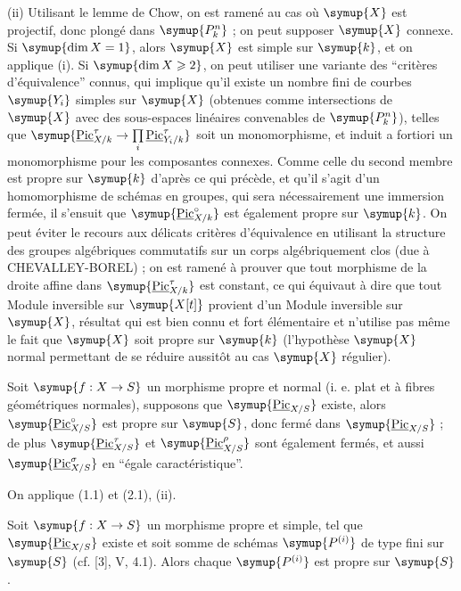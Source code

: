 (ii) Utilisant le lemme de Chow, on est ramené au cas où $\symup{X}$ est projectif,
donc plongé dans $\symup{P_k^n}$ ; on peut supposer $\symup{X}$ connexe. Si
$\symup{\dim X=1}$, alors $\symup{X}$ est simple sur $\symup{k}$, et on applique (i). Si $\symup{\dim X\geqslant2}$,
on peut utiliser une variante des ``critères d'équivalence'' connus, qui
implique qu'il existe un nombre fini de courbes $\symup{Y_i}$ simples sur $\symup{X}$ (obtenues
comme intersections de $\symup{X}$ avec des sous-espaces linéaires convenables de
$\symup{P_k^n}$), telles que $\symup{\underline{\operatorname{Pic}}_{X/k}^\tau\to\prod\limits_i\underline{\operatorname{Pic}}_{Y_i/k}^\tau}$ soit un monomorphisme, et induit a fortiori un monomorphisme pour les
composantes connexes. Comme celle du second membre est propre sur $\symup{k}$ d'après
ce qui précède, et qu'il s'agit d'un homomorphisme de schémas en groupes, qui
sera nécessairement une immersion fermée, il s'ensuit que
$\symup{\underline{\operatorname{Pic}}_{X/k}^\circ}$ est également propre sur $\symup{k}$. On peut éviter
le recours aux délicats critères d'équivalence en utilisant la structure des
groupes algébriques commutatifs sur un corps algébriquement clos (due à
CHEVALLEY-BOREL) ; on est ramené à prouver que tout morphisme de la droite
affine dans $\symup{\underline{\operatorname{Pic}}_{X/k}^\tau}$ est constant, ce qui
équivaut à dire que tout Module inversible sur
$\symup{X[t]}$ provient d'un Module inversible sur $\symup{X}$, résultat qui
est bien connu et fort élémentaire et n'utilise pas même le fait que $\symup{X}$ soit
propre sur $\symup{k}$ (l'hypothèse $\symup{X}$ normal permettant de se réduire aussitôt au cas
$\symup{X}$ régulier).

 Soit $\symup{f:X\to S}$ un morphisme propre et
normal (i. e. plat et à fibres géométriques normales), supposons que
$\symup{\underline{\operatorname{Pic}}_{X/S}}$ existe, alors $\symup{\underline{\operatorname{Pic}}_{X/S}^\circ}$ est
propre sur $\symup{S}$, donc fermé dans $\symup{\underline{\operatorname{Pic}}_{X/S}}$ ; de plus
$\symup{\underline{\operatorname{Pic}}_{X/S}^\tau}$ et $\symup{\underline{\operatorname{Pic}}_{X/S}^\rho}$ sont
également fermés, et aussi $\symup{\underline{\operatorname{Pic}}_{X/S}^\sigma}$ en ``égale caractéristique''.

On applique (1.1) et (2.1), (ii).

 Soit $\symup{f:X\to S}$ un morphisme propre et
simple, tel que $\symup{\underline{\operatorname{Pic}}_{X/S}}$ existe et soit somme de schémas
$\symup{P^{(i)}}$ de type fini sur $\symup{S}$ (cf. [3], V, 4.1). Alors chaque $\symup{P^{(i)}}$ est
propre sur $\symup{S}$.

